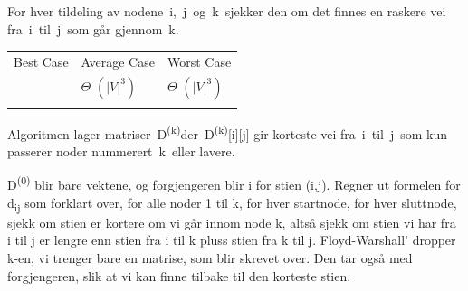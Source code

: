 \documentclass[12pt]{report}
\begin{document}
For hver tildeling av nodene i, j og k sjekker den om det finnes en raskere vei fra i til j som går gjennom k.\par





\begin{table}[H]
 			\centering
\begin{tabular}{p{1.75in}p{2.41in}p{1.91in}}
\hline
\multicolumn{1}{p{1.75in}}{{\fontsize{13pt}{15.6pt}\selectfont Best Case}} & 
\multicolumn{1}{p{2.41in}}{{\fontsize{13pt}{15.6pt}\selectfont Average Case}} & 
\multicolumn{1}{p{1.91in}}{{\fontsize{13pt}{15.6pt}\selectfont Worst Case}} \\
\hhline{---}
\multicolumn{1}{p{1.75in}}{{\fontsize{14pt}{16.8pt}\selectfont $ \Theta $  \(  \left(  \vert V \vert ^{3} \right)  \) }} & 
\multicolumn{1}{p{2.41in}}{{\fontsize{14pt}{16.8pt}\selectfont $ \Theta $  \(  \left(  \vert V \vert ^{3} \right)  \) }} & 
\multicolumn{1}{p{1.91in}}{{\fontsize{14pt}{16.8pt}\selectfont $ \Theta $  \(  \left(  \vert V \vert ^{3} \right)  \) }} \\
\hhline{---}

\end{tabular}
 \end{table}



Algoritmen lager matriser D\textsuperscript{(k)}der D\textsuperscript{(k)}[i][j] gir korteste vei fra i til j som kun passerer noder nummerert k eller lavere.\par


\vspace{\baselineskip}
D\textsuperscript{(0)} blir bare vektene, og forgjengeren blir i for stien (i,j). Regner ut formelen for d\textsubscript{ij} som forklart over, for alle noder 1 til k, for hver startnode, for hver sluttnode, sjekk om stien er kortere om vi går innom node k, altså sjekk om stien vi har fra i til j er lengre enn stien fra i til k pluss stien fra k til j. Floyd-Warshall’ dropper k-en, vi trenger bare en matrise, som blir skrevet over. Den tar også med forgjengeren, slik at vi kan finne tilbake til den korteste stien. \par

 


\newpage
\par
\end{document}
